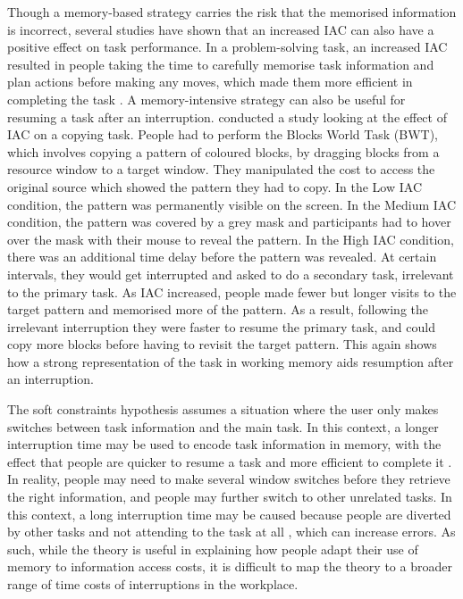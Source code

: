 Though a memory-based strategy carries the risk that the memorised information is incorrect, several studies have shown that an increased IAC can also have a positive effect on task performance. In a problem-solving task, an increased IAC resulted in people taking the time to carefully memorise task information and plan actions before making any moves, which made them more efficient in completing the task \citep[e.g.][]{Morgan2007, Morgan2012}. A memory-intensive strategy can also be useful for resuming a task after an interruption. \citet{Morgan2009} conducted a study looking at the effect of IAC on a copying task. People had to perform the Blocks World Task (BWT), which involves copying a pattern of coloured blocks, by dragging blocks from a resource window to a target window. They manipulated the cost to access the original source which showed the pattern they had to copy. In the Low IAC condition, the pattern was permanently visible on the screen. In the Medium IAC condition, the pattern was covered by a grey mask and participants had to hover over the mask with their mouse to reveal the pattern. In the High IAC condition, there was an additional time delay before the pattern was revealed. At certain intervals, they would get interrupted and asked to do a secondary task, irrelevant to the primary task. As IAC increased, people made fewer but longer visits to the target pattern and memorised more of the pattern. As a result, following the irrelevant interruption they were faster to resume the primary task, and could copy more blocks before having to revisit the target pattern. This again shows how a strong representation of the task in working memory aids resumption after an interruption.

The soft constraints hypothesis assumes a situation where the user only makes switches between task information and the main task. In this context, a longer interruption time may be used to encode task information in memory, with the effect that people are quicker to resume a task and more efficient to complete it \citep{Morgan2007, Morgan2012}. In reality, people may need to make several window switches before they retrieve the right information, and people may further switch to other unrelated tasks. In this context, a long interruption time may be caused because people are diverted by other tasks and not attending to the task at all \citep{Iqbal2008}, which can increase errors. As such, while the theory is useful in explaining how people adapt their use of memory to information access costs, it is difficult to map the theory to a broader range of time costs of interruptions in the workplace. 

